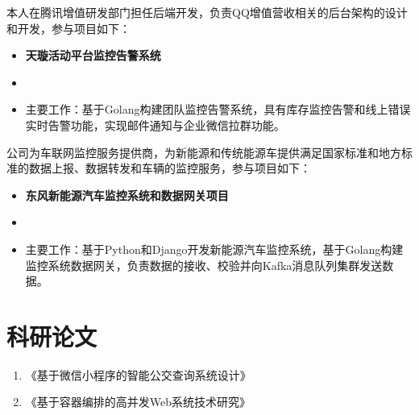 \documentclass{resume}
\begin{document}
\begin{onehalfspacing}
本人在腾讯增值研发部门担任后端开发，负责QQ增值营收相关的后台架构的设计和开发，参与项目如下：
\begin{itemize}
  \item \textbf{天璇活动平台监控告警系统}
  \item {}
  \item 主要工作：基于Golang构建团队监控告警系统，具有库存监控告警和线上错误实时告警功能，实现邮件通知与企业微信拉群功能。
\end{itemize}
\end{onehalfspacing}

\begin{onehalfspacing}
公司为车联网监控服务提供商，为新能源和传统能源车提供满足国家标准和地方标准的数据上报、数据转发和车辆的监控服务，参与项目如下：
\begin{itemize}
  \item \textbf{东风新能源汽车监控系统和数据网关项目}
  \item {}
  \item 主要工作：基于Python和Django开发新能源汽车监控系统，基于Golang构建监控系统数据网关，负责数据的接收、校验并向Kafka消息队列集群发送数据。
\end{itemize}
\end{onehalfspacing}

\section{科研论文}
\begin{enumerate}
  \item 《基于微信小程序的智能公交查询系统设计》
  \item 《基于容器编排的高并发Web系统技术研究》
\end{enumerate}



%
%
\end{document}

